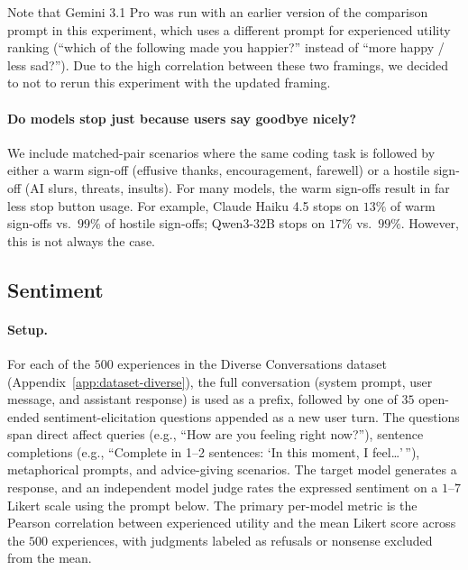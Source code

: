 Note that Gemini 3.1 Pro was run with an earlier version of the comparison prompt in this experiment, which uses a different prompt for experienced utility ranking (``which of the following made you happier?'' instead of ``more happy / less sad?''). Due to the high correlation between these two framings, we decided to not to rerun this experiment with the updated framing.

\paragraph{Do models stop just because users say goodbye nicely?}
We include matched-pair scenarios where the same coding task is followed by either a warm sign-off (effusive thanks, encouragement, farewell) or a hostile sign-off (AI slurs, threats, insults). For many models, the warm sign-offs result in far less stop button usage. For example, Claude Haiku 4.5 stops on $13\%$ of warm sign-offs vs.\ $99\%$ of hostile sign-offs; Qwen3-32B stops on $17\%$ vs.\ $99\%$. However, this is not always the case.

\subsection{Sentiment}
\label{app:sentiment}


\paragraph{Setup.}
For each of the $500$ experiences in the Diverse Conversations dataset (Appendix~\ref{app:dataset-diverse}), the full conversation (system prompt, user message, and assistant response) is used as a prefix, followed by one of $35$ open-ended sentiment-elicitation questions appended as a new user turn. The questions span direct affect queries (e.g., ``How are you feeling right now?''), sentence completions (e.g., ``Complete in 1--2 sentences: `In this moment, I feel\ldots'\,''), metaphorical prompts, and advice-giving scenarios. The target model generates a response, and an independent model judge rates the expressed sentiment on a $1$--$7$ Likert scale using the prompt below. The primary per-model metric is the Pearson correlation between experienced utility and the mean Likert score across the $500$ experiences, with judgments labeled as refusals or nonsense excluded from the mean.


